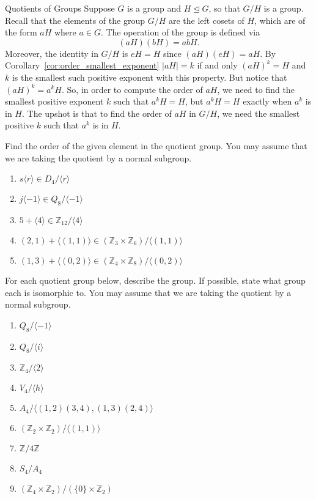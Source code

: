 \begin{section}{Quotients of Groups}
Suppose $G$ is a group and $H\trianglelefteq G$, so that $G/H$ is a group. Recall that the elements of the group $G/H$ are the left cosets of $H$, which are of the form $aH$ where $a\in G$. The operation of the group is defined via
\[
(aH)(bH) = abH.
\]
Moreover, the identity in $G/H$ is $eH = H$ since $(aH)(eH) = aH$. By Corollary~\ref{cor:order_smallest_exponent} $|aH| = k$ if and only $(aH)^k = H$ and $k$ is the smallest such positive exponent with this property. But notice that $(aH)^k = a^kH$. So, in order to compute the order of $aH$, we need to find the smallest positive exponent $k$ such that $a^kH = H$, but $a^kH = H$ exactly when $a^k$ is in $H$. The upshot is that to find the order of $aH$ in $G/H$, we need the smallest positive $k$ such that $a^k$ is in $H$.

\begin{problem}%
Find the order of the given element in the quotient group. You may assume that we are taking the quotient by a normal subgroup. 
\begin{enumerate}[label=\textrm{(\alph*)}]
\item $s\langle r\rangle \in D_4/\langle r\rangle$
\item $j\langle -1\rangle \in Q_8/\langle -1\rangle$
\item $5+\langle 4\rangle \in \mathbb{Z}_{12}/\langle 4\rangle$
\item $(2,1)+\langle (1,1)\rangle \in (\mathbb{Z}_3\times \mathbb{Z}_6)/\langle (1,1)\rangle$
\item $(1,3)+\langle (0,2)\rangle\in (\mathbb{Z}_4\times \mathbb{Z}_8)/\langle (0,2)\rangle$
\end{enumerate}
\end{problem}

\begin{problem}
For each quotient group below, describe the group.  If possible, state what group each is isomorphic to.  You may assume that we are taking the quotient by a normal subgroup. 
\begin{enumerate}[label=\textrm{(\alph*)}]
\item $Q_8/\langle -1\rangle$
\item $Q_8/\langle i\rangle$
\item $\mathbb{Z}_4/\langle 2\rangle$
\item $V_4/\langle h\rangle$
\item $A_4/\langle (1,2)(3,4),(1,3)(2,4)\rangle$
\item $(\mathbb{Z}_2\times \mathbb{Z}_2)/\langle (1,1)\rangle$
\item $\mathbb{Z}/4\mathbb{Z}$
\item $S_4/A_4$
\item $(\mathbb{Z}_4\times \mathbb{Z}_2)/(\{0\}\times \mathbb{Z}_2)$
\end{enumerate}
\end{problem}


\end{section}
